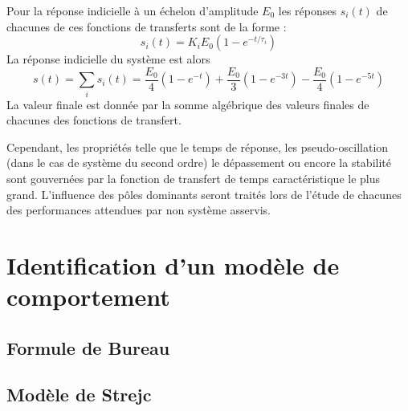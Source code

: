 Pour la réponse indicielle à un échelon d'amplitude $E_0$ les 
réponses $s_i(t)$ de chacunes de ces fonctions de transferts sont de la 
forme :
\[
s_i(t)=K_iE_0\left(1-e^{-t/\tau_i}\right)
\]
La réponse indicielle du système est alors
\[
s(t)=\sum_i s_i(t) = 
\dfrac{E_0}{4}\left(1-e^{-t}\right)+
\dfrac{E_0}{3}\left(1-e^{-3t}\right)-
\dfrac{E_0}{4}\left(1-e^{-5t}\right)
\]
La valeur finale est donnée par la somme algébrique des valeurs finales de 
chacunes des fonctions de transfert.

Cependant, les propriétés telle que le temps de réponse, 
les pseudo-oscillation (dans le cas de système du second ordre) 
le dépassement ou encore la stabilité sont gouvernées 
par la fonction de transfert de temps caractéristique le plus grand. 
L'influence des pôles dominants seront traités lors de l'étude 
de chacunes des performances attendues par non système asservis.
\section{Identification d'un modèle de comportement}
\subsection{Formule de Bureau}
\acplhp
\subsection{Modèle de Strejc}
\acplhp
